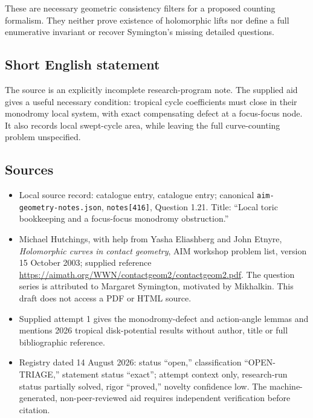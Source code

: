 \documentclass[11pt]{article}
\begin{document}
These are necessary geometric consistency filters for a proposed counting formalism. They neither prove existence of holomorphic lifts nor define a full enumerative invariant or recover Symington's missing detailed questions.
\subsection{Short English statement}
The source is an explicitly incomplete research-program note. The supplied aid gives a useful necessary condition: tropical cycle coefficients must close in their monodromy local system, with exact compensating defect at a focus-focus node. It also records local swept-cycle area, while leaving the full curve-counting problem unspecified.
\subsection{Sources}
\begin{itemize}
\item Local source record: catalogue entry, catalogue entry; canonical \texttt{aim-geometry-notes.json}, \texttt{notes[416]}, Question 1.21. Title: ``Local toric bookkeeping and a focus-focus monodromy obstruction.''
\item Michael Hutchings, with help from Yasha Eliashberg and John Etnyre, \emph{Holomorphic curves in contact geometry}, AIM workshop problem list, version 15 October 2003; supplied reference \url{https://aimath.org/WWN/contactgeom2/contactgeom2.pdf}. The question series is attributed to Margaret Symington, motivated by Mikhalkin. This draft does not access a PDF or HTML source.
\item Supplied attempt 1 gives the monodromy-defect and action-angle lemmas and mentions 2026 tropical disk-potential results without author, title or full bibliographic reference.
\item Registry dated 14 August 2026: status ``open,'' classification ``OPEN-TRIAGE,'' statement status ``exact''; attempt context only, research-run status partially solved, rigor ``proved,'' novelty confidence low. The machine-generated, non-peer-reviewed aid requires independent verification before citation.
\end{itemize}
\end{document}

